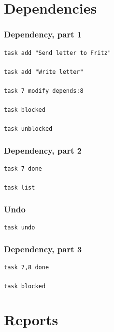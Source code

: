 \documentclass[t,handout]{beamer}
\begin{document}
\section{Dependencies}

\begin{frame}[fragile]\frametitle{Dependency, part 1}
    \vfill
    \begin{lstlisting}
task add "Send letter to Fritz"

task add "Write letter"

task 7 modify depends:8

task blocked

task unblocked
\end{lstlisting}
\end{frame}

\begin{frame}[fragile]\frametitle{Dependency, part 2}
    \vfill
    \begin{lstlisting}
task 7 done

task list
\end{lstlisting}
\end{frame}

\begin{frame}[fragile]\frametitle{Undo}
    \vfill
    \begin{lstlisting}
task undo\end{lstlisting}
\end{frame}

\begin{frame}[fragile]\frametitle{Dependency, part 3}
    \vfill
    \begin{lstlisting}
task 7,8 done

task blocked
\end{lstlisting}
\end{frame}

\section{Reports}
\end{document}
